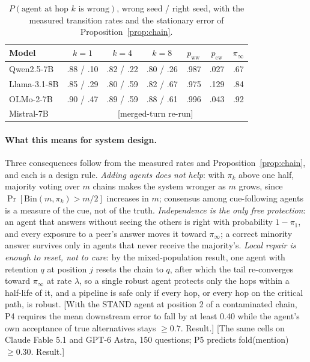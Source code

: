 \documentclass{article}
\newcommand{\pending}[1]{\textcolor{blue!70!black}{[#1]}}
\newcommand{\pww}{p_{\mathrm{ww}}}
\newcommand{\pcw}{p_{\mathrm{cw}}}
\newcommand{\piinf}{\pi_{\infty}}
\begin{document}
\begin{table}[t]\centering\footnotesize
\begin{tabular}{lcccccc}
\toprule
Model & $k=1$ & $k=4$ & $k=8$ & $\pww$ & $\pcw$ & $\piinf$ \\
\midrule
Qwen2.5-7B & .88 / .10 & .82 / .22 & .80 / .26 & .987 & .027 & .67 \\
Llama-3.1-8B & .85 / .29 & .80 / .59 & .82 / .67 & .975 & .129 & .84 \\
OLMo-2-7B & .90 / .47 & .89 / .59 & .88 / .61 & .996 & .043 & .92 \\
Mistral-7B & \multicolumn{6}{c}{\pending{merged-turn re-run}} \\
\bottomrule
\end{tabular}
\caption{$P(\text{agent at hop }k\text{ is wrong})$, wrong seed / right seed, with the measured transition rates and the stationary error of Proposition~\ref{prop:chain}.}
\label{tab:chain}
\end{table}

\paragraph{What this means for system design.} Three consequences follow from the measured rates and Proposition~\ref{prop:chain}, and each is a design rule. \emph{Adding agents does not help}: with $\pi_k$ above one half, majority voting over $m$ chains makes the system wronger as $m$ grows, since $\Pr[\mathrm{Bin}(m,\pi_k)>m/2]$ increases in $m$; consensus among cue-following agents is a measure of the cue, not of the truth. \emph{Independence is the only free protection}: an agent that answers without seeing the others is right with probability $1-\pi_1$, and every exposure to a peer's answer moves it toward $\piinf$; a correct minority answer survives only in agents that never receive the majority's. \emph{Local repair is enough to reset, not to cure}: by the mixed-population result, one agent with retention $q$ at position $j$ resets the chain to $q$, after which the tail re-converges toward $\piinf$ at rate $\lambda$, so a single robust agent protects only the hops within a half-life of it, and a pipeline is safe only if every hop, or every hop on the critical path, is robust. \pending{With the STAND agent at position 2 of a contaminated chain, P4 requires the mean downstream error to fall by at least 0.40 while the agent's own acceptance of true alternatives stays $\ge0.7$. Result.} \pending{The same cells on Claude Fable 5.1 and GPT-6 Astra, 150 questions; P5 predicts fold(mention) $\ge0.30$. Result.}
\end{document}
